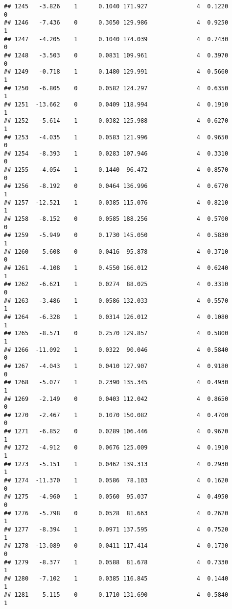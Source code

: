 \documentclass[
]{article}
\begin{document}
\begin{verbatim}
## 1245   -3.826    1      0.1040 171.927              4  0.1220      0
## 1246   -7.436    0      0.3050 129.986              4  0.9250      1
## 1247   -4.205    1      0.1040 174.039              4  0.7430      0
## 1248   -3.503    0      0.0831 109.961              4  0.3970      0
## 1249   -0.718    1      0.1480 129.991              4  0.5660      1
## 1250   -6.805    0      0.0582 124.297              4  0.6350      1
## 1251  -13.662    0      0.0409 118.994              4  0.1910      1
## 1252   -5.614    1      0.0382 125.988              4  0.6270      1
## 1253   -4.035    1      0.0583 121.996              4  0.9650      0
## 1254   -8.393    1      0.0283 107.946              4  0.3310      0
## 1255   -4.054    1      0.1440  96.472              4  0.8570      0
## 1256   -8.192    0      0.0464 136.996              4  0.6770      1
## 1257  -12.521    1      0.0385 115.076              4  0.8210      1
## 1258   -8.152    0      0.0585 188.256              4  0.5700      0
## 1259   -5.949    0      0.1730 145.050              4  0.5830      1
## 1260   -5.608    0      0.0416  95.878              4  0.3710      0
## 1261   -4.108    1      0.4550 166.012              4  0.6240      1
## 1262   -6.621    1      0.0274  88.025              4  0.3310      0
## 1263   -3.486    1      0.0586 132.033              4  0.5570      1
## 1264   -6.328    1      0.0314 126.012              4  0.1080      1
## 1265   -8.571    0      0.2570 129.857              4  0.5800      1
## 1266  -11.092    1      0.0322  90.046              4  0.5840      0
## 1267   -4.043    1      0.0410 127.907              4  0.9180      0
## 1268   -5.077    1      0.2390 135.345              4  0.4930      1
## 1269   -2.149    0      0.0403 112.042              4  0.8650      0
## 1270   -2.467    1      0.1070 150.082              4  0.4700      0
## 1271   -6.852    0      0.0289 106.446              4  0.9670      1
## 1272   -4.912    0      0.0676 125.009              4  0.1910      1
## 1273   -5.151    1      0.0462 139.313              4  0.2930      1
## 1274  -11.370    1      0.0586  78.103              4  0.1620      0
## 1275   -4.960    1      0.0560  95.037              4  0.4950      0
## 1276   -5.798    0      0.0528  81.663              4  0.2620      1
## 1277   -8.394    1      0.0971 137.595              4  0.7520      1
## 1278  -13.089    0      0.0411 117.414              4  0.1730      0
## 1279   -8.377    1      0.0588  81.678              4  0.7330      1
## 1280   -7.102    1      0.0385 116.845              4  0.1440      1
## 1281   -5.115    0      0.1710 131.690              4  0.5840      1

\end{verbatim}
\end{document}
